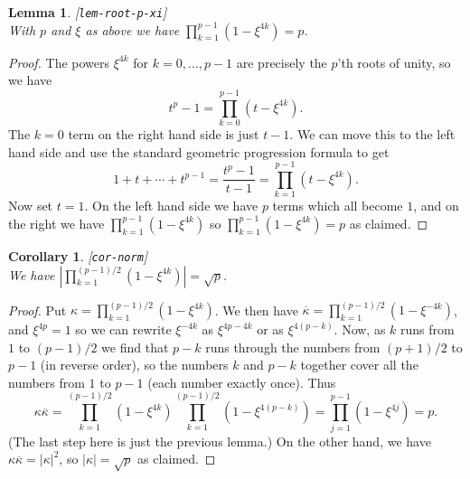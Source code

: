 \documentclass{amsart}
\newcommand{\lbl}[1]{\label{#1}\textup{[\texttt{#1}]}\ \\}
\newcommand{\lbl}{\label}
\newcommand{\kp}        {\kappa}
\newcommand{\ov}[1]     {\overline{#1}}
\renewcommand{\:}{\colon}
\newtheorem{lemma}[theorem]{Lemma}
\newtheorem{corollary}[theorem]{Corollary}
\theoremstyle{definition}
\begin{document}
\begin{lemma}\lbl{lem-root-p-xi}
 With $p$ and $\xi$ as above we have
 $\prod_{k=1}^{p-1}(1-\xi^{4k})=p$. 
\end{lemma}
\begin{proof}
 The powers $\xi^{4k}$ for $k=0,\dotsc,p-1$ are precisely the $p$'th
 roots of unity, so we have
 \[ t^p-1 = \prod_{k=0}^{p-1} (t-\xi^{4k}). \]
 The $k=0$ term on the right hand side is just $t-1$.  We can move
 this to the left hand side and use the standard geometric progression
 formula to get
 \[ 1 + t + \dotsb + t^{p-1} = \frac{t^p-1}{t-1} = 
     \prod_{k=1}^{p-1} (t-\xi^{4k}).
 \]
 Now set $t=1$.  On the left hand side we have $p$ terms which all
 become $1$, and on the right we have $\prod_{k=1}^{p-1}(1-\xi^{4k})$
 so $\prod_{k=1}^{p-1}(1-\xi^{4k})=p$ as claimed.
\end{proof}

\begin{corollary}\lbl{cor-norm}
 We have $|\prod_{k=1}^{(p-1)/2}(1-\xi^{4k})|=\sqrt{p}$.
\end{corollary}
\begin{proof}
 Put $\kp=\prod_{k=1}^{(p-1)/2}(1-\xi^{4k})$.  We then have
 $\ov{\kp}=\prod_{k=1}^{(p-1)/2}(1-\xi^{-4k})$, and $\xi^{4p}=1$ so we
 can rewrite $\xi^{-4k}$ as $\xi^{4p-4k}$ or as $\xi^{4(p-k)}$.  Now,
 as $k$ runs from $1$ to $(p-1)/2$ we find that $p-k$ runs through the
 numbers from $(p+1)/2$ to $p-1$ (in reverse order), so the numbers
 $k$ and $p-k$ together cover all the numbers from $1$ to $p-1$ (each
 number exactly once).  Thus 
 \[ \kp\ov{\kp} =
      \prod_{k=1}^{(p-1)/2}(1-\xi^{4k})
      \prod_{k=1}^{(p-1)/2}(1-\xi^{4(p-k)}) =
      \prod_{j=1}^{p-1}(1-\xi^{4j}) = p.
 \]
 (The last step here is just the previous lemma.)  On the other hand,
 we have $\kp\ov{\kp}=|\kp|^2$, so $|\kp|=\sqrt{p}$ as claimed.
\end{proof}
\end{document}
